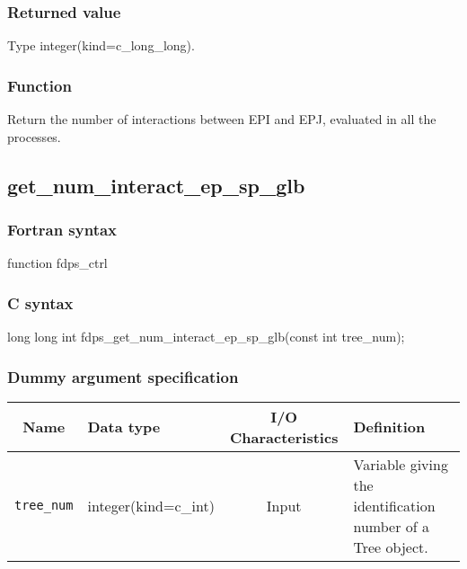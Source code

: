 \subsubsection*{Returned value}
Type integer(kind=c\_long\_long).

\subsubsection*{Function}
Return the number of interactions between EPI and EPJ, evaluated in all the processes.
\clearpage

\subsection{get\_num\_interact\_ep\_sp\_glb}
\subsubsection*{Fortran syntax}
\begin{screen}
\begin{spverbatim}
function fdps_ctrl%
\end{spverbatim}
\end{screen}

\subsubsection*{C syntax}
\begin{screen}
\begin{spverbatim}
long long int fdps_get_num_interact_ep_sp_glb(const int tree_num);
\end{spverbatim}
\end{screen}

\subsubsection*{Dummy argument specification}
\begin{table}[h]
\begin{tabularx}{\linewidth}{cXcX}
\toprule
\rowcolor{Snow2}
Name & Data type & I/O Characteristics & Definition \\
\midrule
\verb|tree_num|  & integer(kind=c\_int) & Input & Variable giving the identification number of a Tree object. \\
\bottomrule
\end{tabularx}
\end{table}

